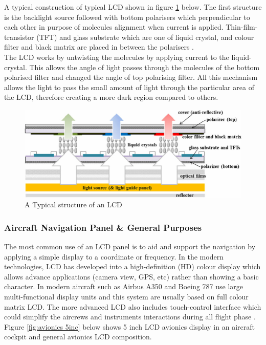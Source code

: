 \noindent A typical construction of typical LCD shown in figure \ref{fig:LCD structure} below. The first structure is the backlight source followed with bottom polarisers which perpendicular to each other in purpose of molecules alignment when current is applied. Thin-film-transistor (TFT) and glass substrate which are one of liquid crystal, and colour filter and black matrix are placed in between the polarisers \cite{AnonymousLCDApplications}. \\ 

\noindent The LCD works by untwisting the molecules by applying current to the liquid-crystal. This allows the angle of light passes through the molecules of the bottom polarised filter and changed the angle of top polarising filter. All this mechanism allows the light to pass the small amount of light through the particular area of the LCD, therefore creating a more dark region compared to others.

\begin{figure}[!ht]
    \centering
    \includegraphics[scale=0.4]{Figures/LCD_Typical structure.png}
    \caption{A Typical structure of an LCD \cite{Park2013EfficiencyPrograms}}
    \label{fig:LCD structure}
\end{figure}

\subsubsection{Aircraft Navigation Panel \& General Purposes}
The most common use of an LCD panel is to aid and support the navigation by applying a simple display to a coordinate or frequency. In the modern technologies, LCD has developed into a  high-definition (HD) colour display which allows advance applications (camera view, GPS, etc)  rather than showing a basic character. In modern aircraft such as Airbus A350 and Boeing 787 use large multi-functional display units \cite{AnonymousTouchAirbus} and this system are usually based on full colour matrix LCD.  The more advanced LCD also includes touch-control interface which could simplify the aircrews and instruments interactions during all flight phase \cite{AnonymousTouchAirbus}. Figure \ref{fig:avionics 5inc} below shows 5 inch LCD avionics display in an aircraft cockpit and general avionics LCD composition.\\

